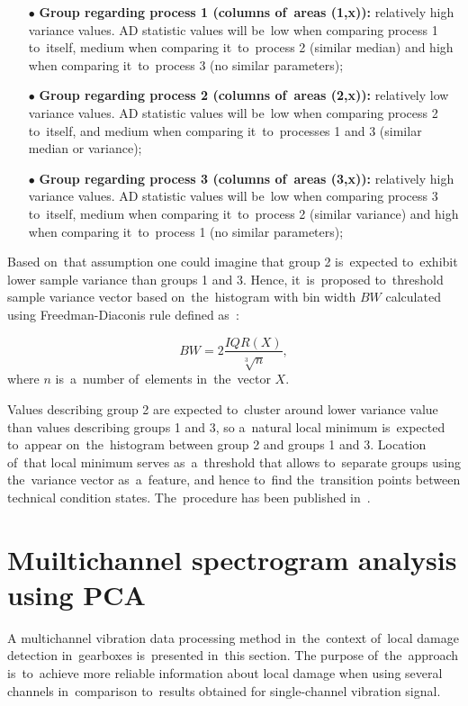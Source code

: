\begin{itemize}
\item[$\bullet$] \textbf{Group regarding process 1 (columns of~areas (1,x)):} relatively high variance values. AD statistic values will be~low when comparing process 1 to~itself, medium when comparing it~to~process 2 (similar median) and high when comparing it~to~process 3 (no similar parameters);
\item[$\bullet$] \textbf{Group regarding process 2 (columns of~areas (2,x)):} relatively low variance values. AD statistic values will be~low when comparing process 2 to~itself, and medium when comparing it~to~processes 1 and 3 (similar median or variance);
\item[$\bullet$] \textbf{Group regarding process 3 (columns of~areas (3,x)):} relatively high variance values. AD statistic values will be~low when comparing process 3 to~itself, medium when comparing it~to~process 2 (similar variance) and high when comparing it~to~process 1 (no similar parameters);
\end{itemize}

Based on~that assumption one could imagine that group 2 is~expected to~exhibit lower sample variance than groups 1 and 3. Hence, it~is~proposed to~threshold sample variance vector based on~the~histogram with bin width $BW$ calculated using Freedman-Diaconis rule defined as~\cite{freedman1981}:

\begin{equation}
  BW=2\frac{IQR(X)}{\sqrt[3]{n}},
\end{equation}
where $n$ is~a~number of~elements in~the~vector $X$.

Values describing group 2 are expected to~cluster around lower variance value than values describing groups 1 and 3, so a~natural local minimum is~expected to~appear on~the~histogram between group 2 and groups 1 and 3. Location of~that local minimum serves as~a~threshold that allows to~separate groups using the~variance vector as~a~feature, and hence to~find the~transition points between technical condition states. The~procedure has been published in~\cite{wodecki2017technical}.

\section{Muiltichannel spectrogram analysis using PCA}\label{met_pca}

A multichannel vibration data processing method in~the~context of~local damage detection in~gearboxes is~presented in~this section. The purpose of~the~approach is~to~achieve more reliable information about local damage when using several channels in~comparison to~results obtained for single-channel vibration signal. 

